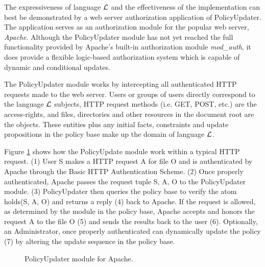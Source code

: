 \documentclass{llncs}
\begin{document}
    The expressiveness of language $\cal{L}$ and the effectiveness of the
    implementation can best be demonstrated by a web server authorization
    application of PolicyUpdater. The application serves as an authorization
    module for the popular web server, \emph{Apache}\footnotemark. Although the
    PolicyUpdater module has not yet reached the full functionality provided
    by Apache's built-in authorization module \emph{mod\_auth}, it does provide
    a flexible logic-based authorization system which is capable of dynamic and
    conditional updates.

    The PolicyUpdater module works by intercepting all authenticated HTTP
    requests made to the web server. Users or groups of users directly
    correspond to the language $\cal{L}$ subjects, HTTP request methods
    (i.e. GET, POST, etc.) are the access-rights, and files, directories
    and other resources in the document root are the objects. These entities
    plus any initial facts, constraints and update propositions in the 
    policy base make up the domain of language $\cal{L}$.

    Figure \ref{fig-1} shows how the PolicyUpdate module work within a typical
    HTTP request. (1) User S makes a HTTP request A for file O and is
    authenticated by Apache through the Basic HTTP Authentication Scheme. (2)
    Once properly authenticated, Apache passes the request tuple {S, A, O} to
    the PolicyUpdater module. (3) PolicyUpdater then queries the policy base
    to verify the atom holds(S, A, O) and returns a reply (4) back to Apache.
    If the request is allowed, as determined by the module in the policy base,
    Apache accepts and honors the request A to the file O (5) and sends the
    results back to the user (6). Optionally, an Administrator, once properly
    authenticated can dynamically update the policy (7) by altering the
    update sequence in the policy base.


    \begin{figure}[h]
      \begin{center}
        \caption{PolicyUpdater module for Apache.}
        \label{fig-1}
      \end{center}
    \end{figure}
\end{document}
